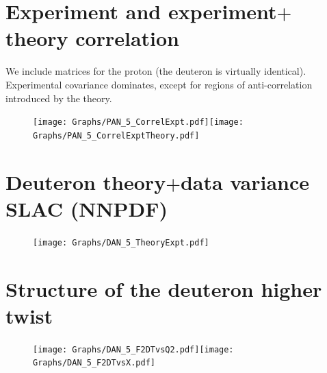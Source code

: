 \documentclass[12pt,a4paper]{report}
\begin{document}
\section{Experiment and experiment$+$theory correlation} \label{sec:res_theory_exp_corr}

We include matrices for the proton (the deuteron is virtually identical). Experimental covariance dominates, except for regions of anti-correlation introduced by the theory.

\begin{figure}[H]
\begin{center}
\texttt{[image: Graphs/PAN\_5\_CorrelExpt.pdf]}\texttt{[image: Graphs/PAN\_5\_CorrelExptTheory.pdf]}
\label{fig:res_theory_exp_corr}
\end{center}
\end{figure}

\section{Deuteron theory$+$data variance SLAC (NNPDF)} \label{sec:res_D_theory_exp}

\begin{figure}[H]
\begin{center}
\texttt{[image: Graphs/DAN\_5\_TheoryExpt.pdf]}
\label{fig:res_D_theory_exp}
\end{center}
\end{figure}

\section{Structure of the deuteron higher twist} \label{sec:ht_structure_deut}

\begin{figure}[H]
\begin{center}
\texttt{[image: Graphs/DAN\_5\_F2DTvsQ2.pdf]}\texttt{[image: Graphs/DAN\_5\_F2DTvsX.pdf]}
\label{fig:res_D_ht_F2DTvsQ2} \label{fig:res_D_ht_F2DTvsX}
\end{center}
\end{figure}

\printbibliography
\end{document}
